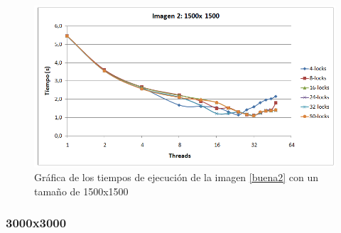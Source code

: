 \begin{figure}[H]
	\captionsetup{justification=centering}
	\centering
	\includegraphics[width=.9\textwidth]{./imagenes/graf2-1500}
	\caption{Gr\'{a}fica de los tiempos de ejecuci\'{o}n de la imagen \ref{buena2} con un tama\~{n}o de 1500x1500}	
	\label{graf2-1500}
\end{figure}


\subsubsection{3000x3000}

